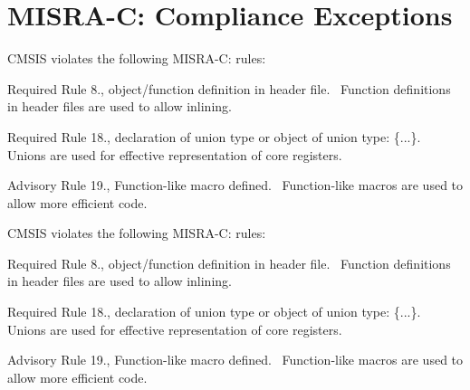 \chapter{MISRA-\/C: Compliance Exceptions }
\hypertarget{_c_m_s_i_s__m_i_s_r_a__exceptions}{}\label{_c_m_s_i_s__m_i_s_r_a__exceptions}
CMSIS violates the following MISRA-\/C: rules:\+

\begin{DoxyItemize}
\item Required Rule 8., object/\+function definition in header file.~\newline
 Function definitions in header files are used to allow \textquotesingle{}inlining\textquotesingle{}.\end{DoxyItemize}
\begin{DoxyItemize}
\item Required Rule 18., declaration of union type or object of union type:\+ \textquotesingle{}\{...\}\textquotesingle{}.~\newline
 Unions are used for effective representation of core registers.\end{DoxyItemize}
\begin{DoxyItemize}
\item Advisory Rule 19., Function-\/like macro defined.~\newline
 Function-\/like macros are used to allow more efficient code.\end{DoxyItemize}


CMSIS violates the following MISRA-\/C: rules:\+

\begin{DoxyItemize}
\item Required Rule 8., object/\+function definition in header file.~\newline
 Function definitions in header files are used to allow \textquotesingle{}inlining\textquotesingle{}.\end{DoxyItemize}
\begin{DoxyItemize}
\item Required Rule 18., declaration of union type or object of union type:\+ \textquotesingle{}\{...\}\textquotesingle{}.~\newline
 Unions are used for effective representation of core registers.\end{DoxyItemize}
\begin{DoxyItemize}
\item Advisory Rule 19., Function-\/like macro defined.~\newline
 Function-\/like macros are used to allow more efficient code.\end{DoxyItemize}


